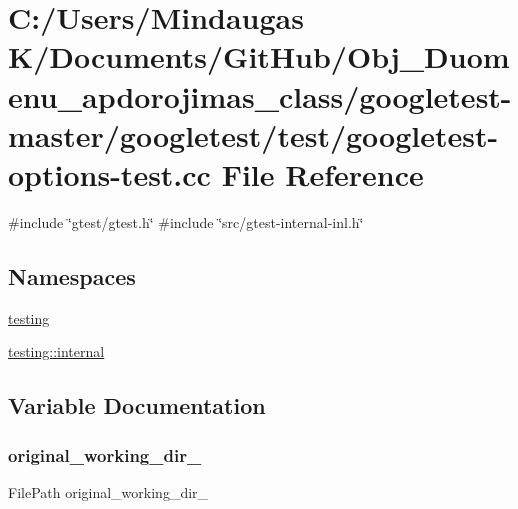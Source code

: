 \hypertarget{googletest-master_2googletest_2test_2googletest-options-test_8cc}{}\section{C\+:/\+Users/\+Mindaugas K/\+Documents/\+Git\+Hub/\+Obj\+\_\+\+Duomenu\+\_\+apdorojimas\+\_\+class/googletest-\/master/googletest/test/googletest-\/options-\/test.cc File Reference}
\label{googletest-master_2googletest_2test_2googletest-options-test_8cc}
{\ttfamily \#include \char`\"{}gtest/gtest.\+h\char`\"{}}\newline
{\ttfamily \#include \char`\"{}src/gtest-\/internal-\/inl.\+h\char`\"{}}\newline
\subsection*{Namespaces}
\begin{DoxyCompactItemize}
\item 
 \mbox{\hyperlink{namespacetesting}{testing}}
\item 
 \mbox{\hyperlink{namespacetesting_1_1internal}{testing\+::internal}}
\end{DoxyCompactItemize}


\subsection{Variable Documentation}
\mbox{\label{googletest-master_2googletest_2test_2googletest-options-test_8cc_aa5f13fd18a275d0a3117700f30bfb9ff}} 
\subsubsection{\texorpdfstring{original\_working\_dir\_}{original\_working\_dir\_}}
{\footnotesize\ttfamily File\+Path original\+\_\+working\+\_\+dir\+\_\+\hspace{0.3cm}{\ttfamily [protected]}}

